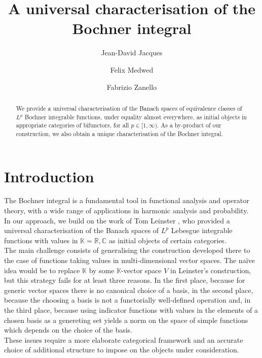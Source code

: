 \documentclass{amsart}
\theoremstyle{definition}
\theoremstyle{plain}
\newcommand{\K}{\mathbb{K}}
\newcommand{\R}{\mathbb{R}}
\newcommand{\C}{\mathbb{C}}
\begin{document}

\title[Bochner integral]{A universal characterisation of the Bochner integral}

\author{Jean\--David Jacques}
\address{Institut f\"ur Mathematik, Universit\"at Potsdam}
\author{Felix Medwed}
\address{Institut f\"ur Mathematik, Universit\"at Potsdam}
\author{Fabrizio Zanello}
\address{Institut f\"ur Mathematik, Universit\"at Potsdam}

\begin{abstract}
    We provide a universal characterisation of the Banach spaces of equivalence classes of $L^p$ Bochner integrable functions, under equality almost everywhere, as initial objects in appropriate categories of bifunctors, for all $p \in [1,\infty)$.
    As a by-product of our construction, we also obtain a unique characterisation of the Bochner integral. 
\end{abstract}

\maketitle

\tableofcontents

\section{Introduction}

    The Bochner integral is a fundamental tool in functional analysis and operator theory, with a wide range of applications in harmonic analysis and probability. \\
    In our approach, we build on the work of Tom Leinster \cite{Leinster2023}, who provided a universal characterisation of the Banach spaces of $L^p$ Lebesgue integrable functions with values in $\K = \R,\C$ as initial objects of certain categories. \\
    The main challenge consists of generalising the construction developed there to the case of functions taking values in multi-dimensional vector spaces. 
    The naïve idea would be to replace $\K$ by some $\K$-vector space $V$ in Leinster's construction, but this strategy fails for at least three reasons.
    In the first place, because for generic vector spaces there is no canonical choice of a basis, in the second place, because the choosing a basis is not a functorially well-defined operation and, in the third place, because using indicator functions with values in the elements of a chosen basis as a genereting set yields a norm on the space of simple functions which depends on the choice of the basis. \\ 
    These issues require a more elaborate categorical framework and an accurate choice of additional structure to impose on the objects under consideration.
\end{document}
